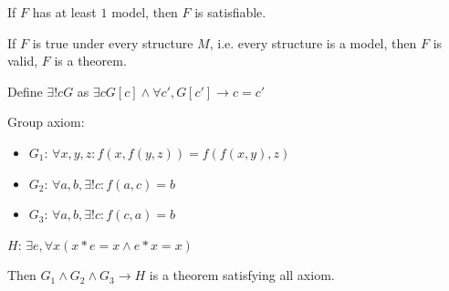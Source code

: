 \begin{definition}[Satisfiable]
If $F$ has at least $1$ model, then $F$ is satisfiable.
\end{definition}

\begin{definition}
If $F$ is true under every structure $M$, i.e. every structure is a model,
  then $F$ is valid, $F$ is a theorem.
\end{definition}


Define \(\exists! c G\) as
\(\exists c G[c] \land \forall c', G[c'] \rightarrow c=c'\)

Group axiom:

\begin{itemize}
\item
  \(G_1\): \(\forall x,y,z: f(x,f(y,z))=f(f(x,y),z)\)
\item
  \(G_2\): \(\forall a,b, \exists! c: f(a,c)=b\)
\item
  \(G_3\): \(\forall a,b, \exists! c: f(c,a)=b\)
\end{itemize}

\(H\): \(\exists e, \forall x (x *e = x \land e*x=x)\)

Then \(G_1\land G_2\land G_3 \rightarrow H\) is a theorem satisfying all axiom.
